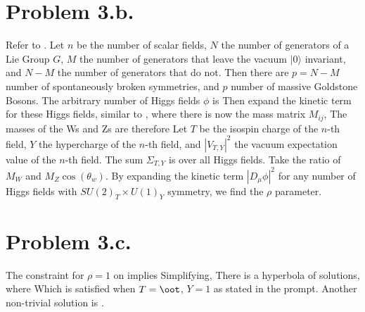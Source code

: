 \documentclass{article}
\begin{document}
\section*{Problem 3.b.}
Refer to \cite{LANGACKER1981185}. Let $n$ be the number of scalar fields, $N$ the number of generators of a Lie Group $G$, $M$ the number of generators that leave the vacuum $|0\rangle$ invariant, and $N-M$ the number of generators that do not. Then there are $p=N-M$ number of spontaneously broken symmetries, and $p$ number of massive Goldstone Bosons. The arbitrary number of Higgs fields $\phi$ is
Then expand the kinetic term for these Higgs fields, similar to ,
where there is now the mass matrix $M_{ij}$,
The masses of the Ws and Zs are therefore
Let $T$ be the isospin charge of the $n$-th field, $Y$ the hypercharge of the $n$-th field, and $|V_{T,Y}|^2$ the vacuum expectation value of the $n$-th field. The sum $\Sigma_{T,Y}$ is over all Higgs fields. Take the ratio of $M_W$ and $M_Z \cos(\theta_w)$.
By expanding the kinetic term $|D_\mu \phi|^2$ for any number of Higgs fields with $SU(2)_T \times U(1)_Y$ symmetry, we find the $\rho$ parameter.
\section*{Problem 3.c.}
The constraint for $\rho=1$ on  implies
Simplifying,
There is a hyperbola of solutions, where
Which is satisfied when $T=\oot$, $Y=1$ as stated in the prompt. Another non-trivial solution is .
\printbibliography
\end{document}
